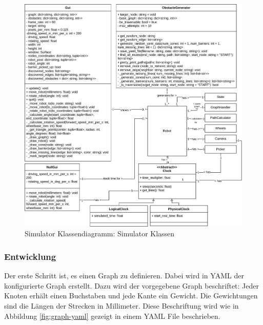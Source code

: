 \begin{figure}[H]
\centering
\includegraphics[width=\textwidth]{assets/informatik-prototyp/simulator/simulator-simulator-erd.png}
\caption{Simulator Klassendiagramm: Simulator Klassen}
\label{fig:simulator-classdia-sim}
\end{figure}

\subsubsection{Entwicklung}

Der erste Schritt ist, es einen Graph zu definieren. Dabei wird in YAML der konfigurierte Graph erstellt. 
Dazu wird der vorgegebene Graph beschriftet: Jeder Knoten erhält einen Buchstaben und jede Kante ein Gewicht. Die Gewichtungen sind die Längen der Strecken in Millimeter. Diese Beschriftung wird wie in Abbildung \ref{fig:graph-yaml} gezeigt in einem YAML File beschrieben.

